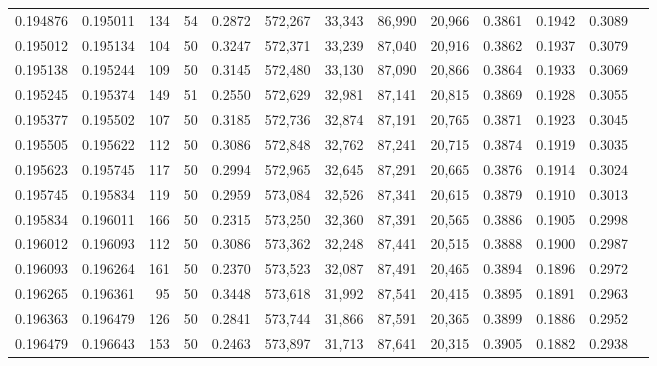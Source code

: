 \begin{tabular}{rrrrrrrrrrrrr}
0.194876 & 0.195011 &   134 &  54 &                                     0.2872 & 572,267 &  33,343 &  86,990 &  20,966 & 0.3861 & 0.1942 & 0.3089 \\
0.195012 & 0.195134 &   104 &  50 &                                     0.3247 & 572,371 &  33,239 &  87,040 &  20,916 & 0.3862 & 0.1937 & 0.3079 \\
0.195138 & 0.195244 &   109 &  50 &                                     0.3145 & 572,480 &  33,130 &  87,090 &  20,866 & 0.3864 & 0.1933 & 0.3069 \\
0.195245 & 0.195374 &   149 &  51 &                                     0.2550 & 572,629 &  32,981 &  87,141 &  20,815 & 0.3869 & 0.1928 & 0.3055 \\
0.195377 & 0.195502 &   107 &  50 &                                     0.3185 & 572,736 &  32,874 &  87,191 &  20,765 & 0.3871 & 0.1923 & 0.3045 \\
0.195505 & 0.195622 &   112 &  50 &                                     0.3086 & 572,848 &  32,762 &  87,241 &  20,715 & 0.3874 & 0.1919 & 0.3035 \\
0.195623 & 0.195745 &   117 &  50 &                                     0.2994 & 572,965 &  32,645 &  87,291 &  20,665 & 0.3876 & 0.1914 & 0.3024 \\
0.195745 & 0.195834 &   119 &  50 &                                     0.2959 & 573,084 &  32,526 &  87,341 &  20,615 & 0.3879 & 0.1910 & 0.3013 \\
0.195834 & 0.196011 &   166 &  50 &                                     0.2315 & 573,250 &  32,360 &  87,391 &  20,565 & 0.3886 & 0.1905 & 0.2998 \\
0.196012 & 0.196093 &   112 &  50 &                                     0.3086 & 573,362 &  32,248 &  87,441 &  20,515 & 0.3888 & 0.1900 & 0.2987 \\
0.196093 & 0.196264 &   161 &  50 &                                     0.2370 & 573,523 &  32,087 &  87,491 &  20,465 & 0.3894 & 0.1896 & 0.2972 \\
0.196265 & 0.196361 &    95 &  50 &                                     0.3448 & 573,618 &  31,992 &  87,541 &  20,415 & 0.3895 & 0.1891 & 0.2963 \\
0.196363 & 0.196479 &   126 &  50 &                                     0.2841 & 573,744 &  31,866 &  87,591 &  20,365 & 0.3899 & 0.1886 & 0.2952 \\
0.196479 & 0.196643 &   153 &  50 &                                     0.2463 & 573,897 &  31,713 &  87,641 &  20,315 & 0.3905 & 0.1882 & 0.2938 \\

\end{tabular}
